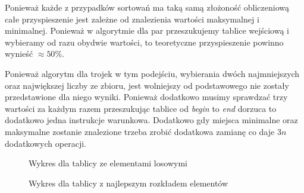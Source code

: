 Ponieważ każde z przypadków sortowań ma taką samą złożoność obliczeniową całe przyspieszenie jest zależne od znalezienia wartości maksymalnej i minimalnej. Ponieważ w algorytmie dla par przeszukujemy tablice wejściową i wybieramy od razu obydwie wartości, to teoretyczne przyspieszenie powinno wynieść $\approx 50\%$.\\
\par Ponieważ algorytm dla trojek w tym podejściu, wybierania dwóch najmniejszych oraz największej liczby ze zbioru, jest wolniejszy od podstawowego nie zostały przedstawione dla niego wyniki. Ponieważ dodatkowo musimy sprawdzać trzy wartości za każdym razem przeszukując tablice od \textit{begin} to \textit{end} dorzuca to dodatkowo jedna instrukcje warunkowa. Dodatkowo gdy miejsca minimalne oraz maksymalne zostanie znalezione trzeba zrobić dodatkowa zamianę co daje $3n$ dodatkowych operacji. 
\begin{figure}[h!]
  \begin{center}
    \caption{Wykres dla tablicy ze elementami losowymi}\label{fig:wyb}
  \end{center}
  \end{figure}
  \begin{figure}[h!]
  \begin{center}
    \caption{Wykres dla tablicy z najlepszym rozkładem elementów}\label{fig:wybBest}
  \end{center}
  \end{figure}
